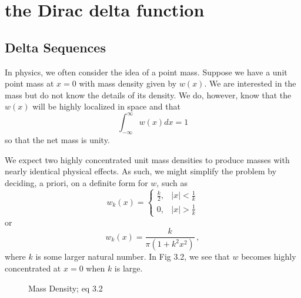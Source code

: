 \section{the Dirac delta function}
\setcounter{example}{0}
\subsection{Delta Sequences}
In physics, we often consider the idea of a point mass. Suppose we have a unit point mass at \(x=0\) with mass density given by \(w(x)\). We are interested in the mass but do not know the details of its density. We do, however, know that the \(w(x)\) will be highly localized in space and that 
\begin{equation}
    \int_{-\infty}^{\infty} w(x) dx = 1
\end{equation}
so that the net mass is unity.

We expect two highly concentrated unit mass densities to produce masses with nearly identical physical effects. As such, we might simplify the problem by deciding, a priori, on a definite form for \(w\), such as
\begin{equation}
    w_k(x) = \begin{cases}
        \frac{k}{2}, & |x|<\frac{1}{k}\\
        0, & |x|>\frac{1}{k}
    \end{cases}
\end{equation}
or
\begin{equation}
    w_k(x)=\frac{k}{\pi (1+k^2x^2)}\,,
\end{equation}
where \(k\) is some larger natural number. In Fig 3.2, we see that \(w\) becomes highly concentrated at \(x=0\) when \(k\) is large.

\begin{figure}
    \centering
    \caption{Mass Density; eq 3.2}
\end{figure}

